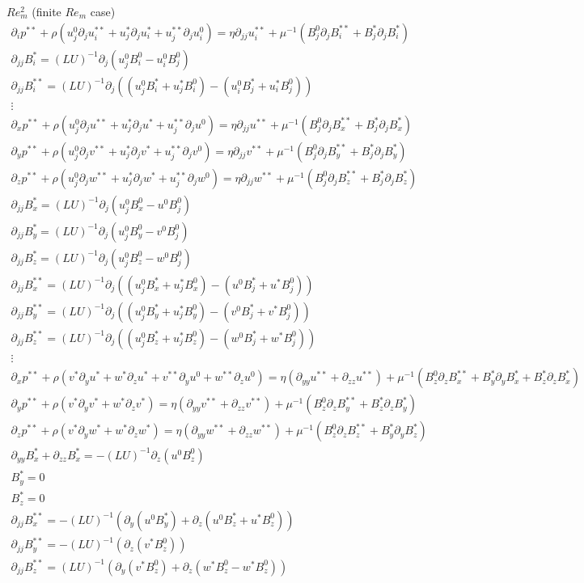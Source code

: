 \documentclass[11pt]{article}
\newcommand{\PD}{\partial}
\begin{document}
\newpage
$Re_m^2$ (finite $Re_m$ case)
\begin{equation}\begin{aligned}
\PD_i p^{**} + \rho (u_j^0 \PD_j u_i^{**} + u_j^* \PD_j u_i^* + u_j^{**} \PD_j u_i^0) = \eta \PD_{jj} u_i^{**} + \mu^{-1} (B_j^0 \PD_j B_i^{**} + B_j^* \PD_j B_i^*) \\
\PD_{jj} B_i^* = (LU)^{-1} \PD_j (u_j^0 B_i^0 - u_i^0 B_j^0) \\
\PD_{jj} B_i^{**} = (LU)^{-1} \PD_j ((u_j^0 B_i^*+u_j^* B_i^0) - (u_i^0 B_j^*+u_i^* B_j^0)) \\
\vdots \\
\PD_x p^{**} + \rho (u_j^0 \PD_j u^{**} + u_j^* \PD_j u^* + u_j^{**} \PD_j u^0) = \eta \PD_{jj} u^{**} + \mu^{-1} (B_j^0 \PD_j B_x^{**} + B_j^* \PD_j B_x^*) \\
\PD_y p^{**} + \rho (u_j^0 \PD_j v^{**} + u_j^* \PD_j v^* + u_j^{**} \PD_j v^0) = \eta \PD_{jj} v^{**} + \mu^{-1} (B_j^0 \PD_j B_y^{**} + B_j^* \PD_j B_y^*) \\
\PD_z p^{**} + \rho (u_j^0 \PD_j w^{**} + u_j^* \PD_j w^* + u_j^{**} \PD_j w^0) = \eta \PD_{jj} w^{**} + \mu^{-1} (B_j^0 \PD_j B_z^{**} + B_j^* \PD_j B_z^*) \\
\PD_{jj} B_x^* = (LU)^{-1} \PD_j (u_j^0 B_x^0 - u^0 B_j^0) \\
\PD_{jj} B_y^* = (LU)^{-1} \PD_j (u_j^0 B_y^0 - v^0 B_j^0) \\
\PD_{jj} B_z^* = (LU)^{-1} \PD_j (u_j^0 B_z^0 - w^0 B_j^0) \\
\PD_{jj} B_x^{**} = (LU)^{-1} \PD_j ((u_j^0 B_x^*+u_j^* B_x^0) - (u^0 B_j^*+u^* B_j^0)) \\
\PD_{jj} B_y^{**} = (LU)^{-1} \PD_j ((u_j^0 B_y^*+u_j^* B_y^0) - (v^0 B_j^*+v^* B_j^0)) \\
\PD_{jj} B_z^{**} = (LU)^{-1} \PD_j ((u_j^0 B_z^*+u_j^* B_z^0) - (w^0 B_j^*+w^* B_j^0)) \\
\vdots \\
\PD_x p^{**} + \rho (v^* \PD_y u^* + w^* \PD_z u^* + v^{**} \PD_y u^0 + w^{**} \PD_z u^0) = \eta (\PD_{yy} u^{**} + \PD_{zz} u^{**}) + \mu^{-1} (B_z^0 \PD_z B_x^{**} + B_y^* \PD_y B_x^* + B_z^* \PD_z B_x^*) \\
\PD_y p^{**} + \rho (v^* \PD_y v^* + w^* \PD_z v^*) = \eta (\PD_{yy} v^{**} + \PD_{zz} v^{**}) + \mu^{-1} (B_z^0 \PD_z B_y^{**} + B_z^* \PD_z B_y^*) \\
\PD_z p^{**} + \rho (v^* \PD_y w^* + w^* \PD_z w^*) = \eta (\PD_{yy} w^{**} + \PD_{zz} w^{**}) + \mu^{-1} (B_z^0 \PD_z B_z^{**} + B_y^* \PD_y B_z^*) \\
\PD_{yy} B_x^* + \PD_{zz} B_x^* = - (LU)^{-1} \PD_z (u^0 B_z^0) \\
B_y^* = 0 \\
B_z^* = 0 \\
\PD_{jj} B_x^{**} =-(LU)^{-1} (\PD_y (u^0 B_y^*) + \PD_z (u^0 B_z^*+u^* B_z^0)) \\
\PD_{jj} B_y^{**} =-(LU)^{-1} (\PD_z (v^* B_z^0)) \\
\PD_{jj} B_z^{**} = (LU)^{-1} (\PD_y (v^* B_z^0) + \PD_z (w^* B_z^0 - w^* B_z^0)) \\
\end{aligned}\end{equation}
\end{document}
